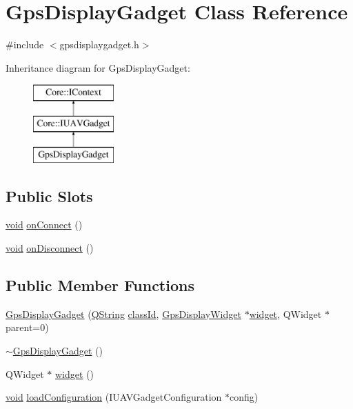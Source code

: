 \hypertarget{class_gps_display_gadget}{\section{\-Gps\-Display\-Gadget \-Class \-Reference}
\label{class_gps_display_gadget}
}


{\ttfamily \#include $<$gpsdisplaygadget.\-h$>$}

\-Inheritance diagram for \-Gps\-Display\-Gadget\-:\begin{figure}[H]
\begin{center}
\leavevmode
\includegraphics[height=3.000000cm]{class_gps_display_gadget}
\end{center}
\end{figure}
\subsection*{\-Public \-Slots}
\begin{DoxyCompactItemize}
\item 
\hyperlink{group___u_a_v_objects_plugin_ga444cf2ff3f0ecbe028adce838d373f5c}{void} \hyperlink{group___g_p_s_gadget_plugin_ga23030a328c534cd4b1eea152db173655}{on\-Connect} ()
\item 
\hyperlink{group___u_a_v_objects_plugin_ga444cf2ff3f0ecbe028adce838d373f5c}{void} \hyperlink{group___g_p_s_gadget_plugin_ga3f91bba10918be6c7bd99533e61883ac}{on\-Disconnect} ()
\end{DoxyCompactItemize}
\subsection*{\-Public \-Member \-Functions}
\begin{DoxyCompactItemize}
\item 
\hyperlink{group___g_p_s_gadget_plugin_ga748699eae5b29ee0958be37c23a348f8}{\-Gps\-Display\-Gadget} (\hyperlink{group___u_a_v_objects_plugin_gab9d252f49c333c94a72f97ce3105a32d}{\-Q\-String} \hyperlink{group___core_plugin_ga3878fde66a57220608960bcc3fbeef2c}{class\-Id}, \hyperlink{class_gps_display_widget}{\-Gps\-Display\-Widget} $\ast$\hyperlink{group___g_p_s_gadget_plugin_ga343958b41e6a9deb4720c9b3098396c2}{widget}, \-Q\-Widget $\ast$parent=0)
\item 
\hyperlink{group___g_p_s_gadget_plugin_ga6ec785be3eefba596601b671573f6401}{$\sim$\-Gps\-Display\-Gadget} ()
\item 
\-Q\-Widget $\ast$ \hyperlink{group___g_p_s_gadget_plugin_ga343958b41e6a9deb4720c9b3098396c2}{widget} ()
\item 
\hyperlink{group___u_a_v_objects_plugin_ga444cf2ff3f0ecbe028adce838d373f5c}{void} \hyperlink{group___g_p_s_gadget_plugin_gace7e777ca2b6d35514b22ec3b8d9f7c5}{load\-Configuration} (\-I\-U\-A\-V\-Gadget\-Configuration $\ast$config)
\end{DoxyCompactItemize}


